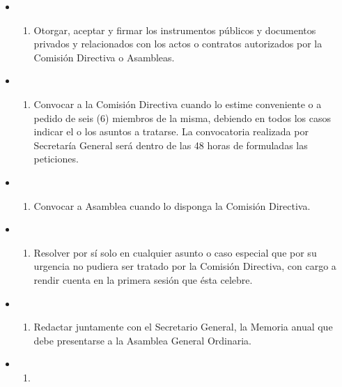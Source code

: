 \documentclass[openany]{book}
\providecommand{\tightlist}{%
  \setlength{\itemsep}{0pt}\setlength{\parskip}{0pt}}
\begin{document}
\begin{itemize}
\begin{itemize}
\begin{enumerate}
    \end{enumerate}
  \item
    \begin{enumerate}
    \def\labelenumi{\alph{enumi})}
    \setcounter{enumi}{6}
    \tightlist
    \item
      Otorgar, aceptar y firmar los instrumentos públicos y documentos privados y relacionados con los actos o contratos autorizados por la Comisión Directiva o Asambleas.
    \end{enumerate}
  \item
    \begin{enumerate}
    \def\labelenumi{\alph{enumi})}
    \setcounter{enumi}{7}
    \tightlist
    \item
      Convocar a la Comisión Directiva cuando lo estime conveniente o a pedido de seis (6) miembros de la misma, debiendo en todos los casos indicar el o los asuntos a tratarse. La convocatoria realizada por Secretaría General será dentro de las 48 horas de formuladas las peticiones.
    \end{enumerate}
  \item
    \begin{enumerate}
    \def\labelenumi{\roman{enumi})}
    \tightlist
    \item
      Convocar a Asamblea cuando lo disponga la Comisión Directiva.
    \end{enumerate}
  \item
    \begin{enumerate}
    \def\labelenumi{\alph{enumi})}
    \setcounter{enumi}{9}
    \tightlist
    \item
      Resolver por sí solo en cualquier asunto o caso especial que por su urgencia no pudiera ser tratado por la Comisión Directiva, con cargo a rendir cuenta en la primera sesión que ésta celebre.
    \end{enumerate}
  \item
    \begin{enumerate}
    \def\labelenumi{\alph{enumi})}
    \setcounter{enumi}{10}
    \tightlist
    \item
      Redactar juntamente con el Secretario General, la Memoria anual que debe presentarse a la Asamblea General Ordinaria.
    \end{enumerate}
  \item
    \begin{enumerate}
    \def\labelenumi{\alph{enumi})}
    \setcounter{enumi}{11}
    \tightlist
    \item

\end{enumerate}
\end{itemize}
\end{itemize}
\end{document}

